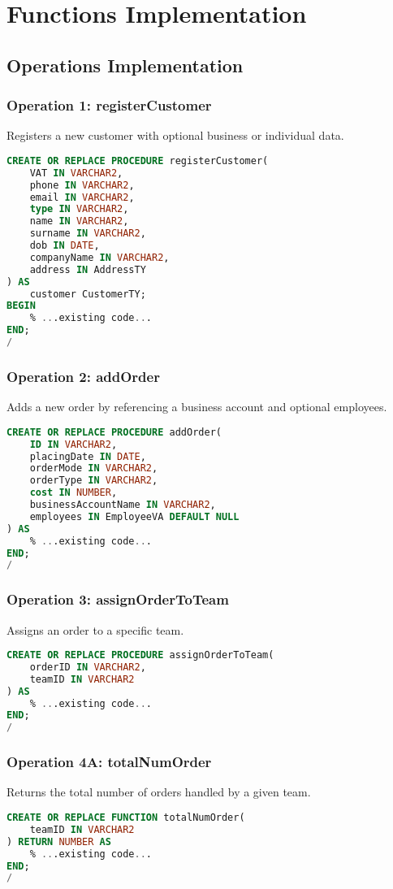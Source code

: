 
\chapter{Functions Implementation}

\section{Operations Implementation}

\subsection{Operation 1: registerCustomer}
Registers a new customer with optional business or individual data.
\begin{lstlisting}[language=SQL]
CREATE OR REPLACE PROCEDURE registerCustomer(
    VAT IN VARCHAR2,
    phone IN VARCHAR2,
    email IN VARCHAR2,
    type IN VARCHAR2,
    name IN VARCHAR2,
    surname IN VARCHAR2,
    dob IN DATE,
    companyName IN VARCHAR2,
    address IN AddressTY
) AS
    customer CustomerTY;
BEGIN
    % ...existing code...
END;
/
\end{lstlisting}

\subsection{Operation 2: addOrder}
Adds a new order by referencing a business account and optional employees.
\begin{lstlisting}[language=SQL]
CREATE OR REPLACE PROCEDURE addOrder(
    ID IN VARCHAR2,
    placingDate IN DATE,
    orderMode IN VARCHAR2,
    orderType IN VARCHAR2,
    cost IN NUMBER,
    businessAccountName IN VARCHAR2,
    employees IN EmployeeVA DEFAULT NULL
) AS
    % ...existing code...
END;
/
\end{lstlisting}

\subsection{Operation 3: assignOrderToTeam}
Assigns an order to a specific team.
\begin{lstlisting}[language=SQL]
CREATE OR REPLACE PROCEDURE assignOrderToTeam(
    orderID IN VARCHAR2,
    teamID IN VARCHAR2
) AS
    % ...existing code...
END;
/
\end{lstlisting}

\subsection{Operation 4A: totalNumOrder}
Returns the total number of orders handled by a given team.
\begin{lstlisting}[language=SQL]
CREATE OR REPLACE FUNCTION totalNumOrder(
    teamID IN VARCHAR2
) RETURN NUMBER AS
    % ...existing code...
END;
/
\end{lstlisting}

